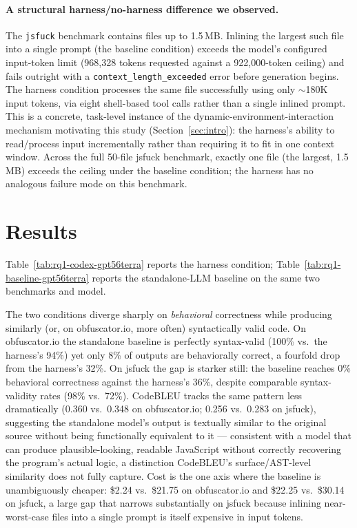 \documentclass[11pt]{article}
\begin{document}
\paragraph{A structural harness/no-harness difference we observed.} The
\texttt{jsfuck} benchmark contains files up to 1.5\,MB. Inlining the
largest such file into a single prompt (the baseline condition) exceeds the
model's configured input-token limit (968{,}328 tokens requested against a
922{,}000-token ceiling) and fails outright with a
\texttt{context\_length\_exceeded} error before generation begins. The
harness condition processes the same file successfully using only
$\sim$180K input tokens, via eight shell-based tool calls rather than a
single inlined prompt. This is a concrete, task-level instance of the
dynamic-environment-interaction mechanism motivating this study
(Section~\ref{sec:intro}): the harness's ability to read/process input
incrementally rather than requiring it to fit in one context window. Across
the full 50-file jsfuck benchmark, exactly one file (the largest, 1.5\,MB)
exceeds the ceiling under the baseline condition; the harness has no
analogous failure mode on this benchmark.

\section{Results}
\label{sec:results}

Table~\ref{tab:rq1-codex-gpt56terra} reports the harness condition;
Table~\ref{tab:rq1-baseline-gpt56terra} reports the standalone-LLM baseline
on the same two benchmarks and model.





The two conditions diverge sharply on \emph{behavioral} correctness while
producing similarly (or, on obfuscator.io, more often) syntactically valid
code. On obfuscator.io the standalone baseline is perfectly syntax-valid
(100\% vs.\ the harness's 94\%) yet only 8\% of outputs are behaviorally
correct, a fourfold drop from the harness's 32\%. On jsfuck the gap is
starker still: the baseline reaches 0\% behavioral correctness against the
harness's 36\%, despite comparable syntax-validity rates (98\% vs.\ 72\%).
CodeBLEU tracks the same pattern less dramatically (0.360 vs.\ 0.348 on
obfuscator.io; 0.256 vs.\ 0.283 on jsfuck), suggesting the standalone
model's output is textually similar to the original source without being
functionally equivalent to it --- consistent with a model that can produce
plausible-looking, readable JavaScript without correctly recovering the
program's actual logic, a distinction CodeBLEU's surface/AST-level
similarity does not fully capture. Cost is the one axis where the baseline
is unambiguously cheaper: \$2.24 vs.\ \$21.75 on obfuscator.io and \$22.25
vs.\ \$30.14 on jsfuck, a large gap that narrows substantially on jsfuck
because inlining near-worst-case files into a single prompt is itself
expensive in input tokens.
\end{document}
